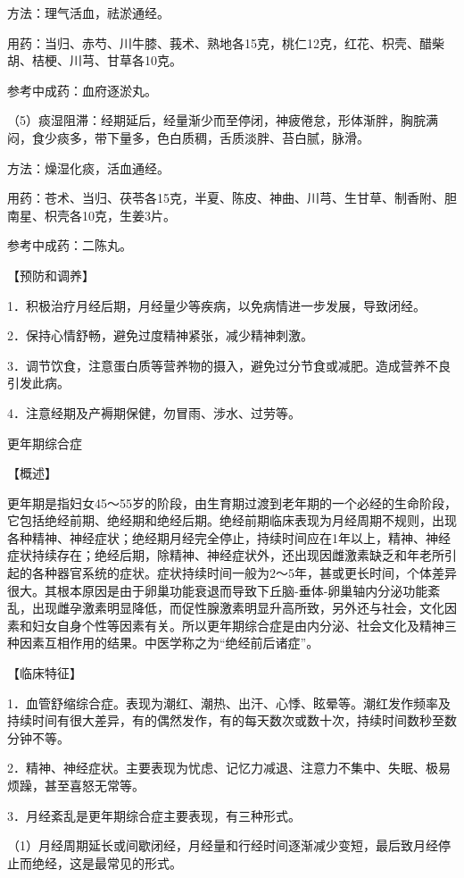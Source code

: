 \documentclass[12pt,UTF8,openany]{ctexbook}
\begin{document}
方法：理气活血，祛淤通经。

用药：当归、赤芍、川牛膝、莪术、熟地各15克，桃仁12克，红花、枳壳、醋柴胡、桔梗、川芎、甘草各10克。

参考中成药：血府逐淤丸。

（5）痰湿阻滞：经期延后，经量渐少而至停闭，神疲倦怠，形体渐胖，胸脘满闷，食少痰多，带下量多，色白质稠，舌质淡胖、苔白腻，脉滑。

方法：燥湿化痰，活血通经。

用药：苍术、当归、茯苓各15克，半夏、陈皮、神曲、川芎、生甘草、制香附、胆南星、枳壳各10克，生姜3片。

参考中成药：二陈丸。

【预防和调养】

1．积极治疗月经后期，月经量少等疾病，以免病情进一步发展，导致闭经。

2．保持心情舒畅，避免过度精神紧张，减少精神刺激。

3．调节饮食，注意蛋白质等营养物的摄入，避免过分节食或减肥。造成营养不良引发此病。

4．注意经期及产褥期保健，勿冒雨、涉水、过劳等。





更年期综合症


【概述】

更年期是指妇女45～55岁的阶段，由生育期过渡到老年期的一个必经的生命阶段，它包括绝经前期、绝经期和绝经后期。绝经前期临床表现为月经周期不规则，出现各种精神、神经症状；绝经期月经完全停止，持续时间应在1年以上，精神、神经症状持续存在；绝经后期，除精神、神经症状外，还出现因雌激素缺乏和年老所引起的各种器官系统的症状。症状持续时间一般为2～5年，甚或更长时间，个体差异很大。其根本原因是由于卵巢功能衰退而导致下丘脑-垂体-卵巢轴内分泌功能紊乱，出现雌孕激素明显降低，而促性腺激素明显升高所致，另外还与社会，文化因素和妇女自身个性等因素有关。所以更年期综合症是由内分泌、社会文化及精神三种因素互相作用的结果。中医学称之为“绝经前后诸症”。

【临床特征】

1．血管舒缩综合症。表现为潮红、潮热、出汗、心悸、眩晕等。潮红发作频率及持续时间有很大差异，有的偶然发作，有的每天数次或数十次，持续时间数秒至数分钟不等。

2．精神、神经症状。主要表现为忧虑、记忆力减退、注意力不集中、失眠、极易烦躁，甚至喜怒无常等。

3．月经紊乱是更年期综合症主要表现，有三种形式。

（1）月经周期延长或间歇闭经，月经量和行经时间逐渐减少变短，最后致月经停止而绝经，这是最常见的形式。
\end{document}
